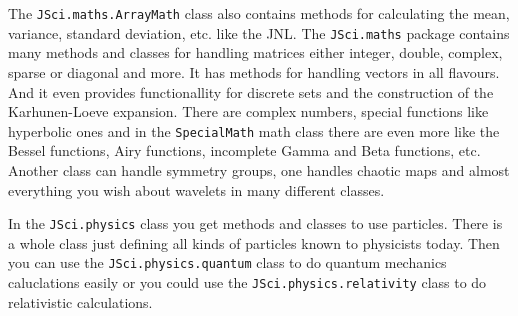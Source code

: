 The \verb|JSci.maths.ArrayMath| class also contains methods for
calculating the mean, variance, standard deviation, etc. like
the JNL. The \verb|JSci.maths| package  
contains many methods and classes for handling matrices
either integer, double, complex, sparse or diagonal and more. It has methods
for handling vectors in all flavours. And it even provides functionallity
for discrete sets and the construction of the Karhunen-Loeve expansion. 
There are complex numbers, special functions like hyperbolic ones
and in the \verb|SpecialMath| math class there are even more like
the Bessel functions, Airy functions, incomplete Gamma and Beta functions, etc.
Another class can handle symmetry groups, one handles chaotic maps and
almost everything you wish about wavelets in many different classes.

In the \verb|JSci.physics| class you get methods and classes to use
particles. There is a whole class just defining all kinds of particles
known to physicists today. Then you can use the \verb|JSci.physics.quantum|
class to do quantum mechanics caluclations easily or you could use
the \verb|JSci.physics.relativity| class to do relativistic calculations.

